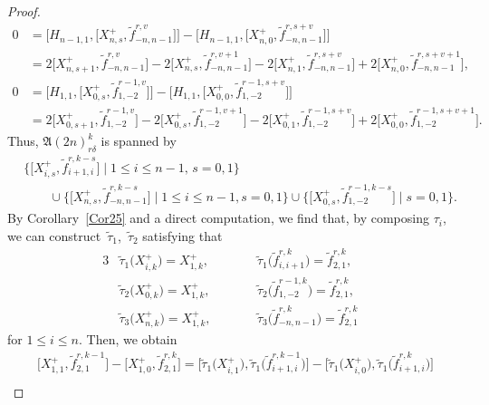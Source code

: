 \documentclass[10pt,a4paper]{amsart}
\numberwithin{equation}{section}
\theoremstyle{definition}
\begin{document}
\begin{proof}
\begin{align}
0&=\bigl[H_{n-1,1},\bigl[X^+_{n,s},\widetilde{f}_{-n,n-1}^{r,v}\bigr]\bigr]-\bigl[H_{n-1,1}, \bigl[X^+_{n,0},\widetilde{f}_{-n,n-1}^{r,s+v}\bigr]\bigr]\nonumber\\%
&=2\bigl[X^+_{n,s+1},\widetilde{f}_{-n,n-1}^{r,v}\bigr]-2\bigl[X^+_{n,s},\widetilde{f}_{-n,n-1}^{r,v+1}\bigr] -2\bigl[X^+_{n,1},\widetilde{f}_{-n,n-1}^{r,s+v}\bigr]+2\bigl[X^+_{n,0},\widetilde{f}_{-n,n-1}^{r,s+v+1}\bigr],\nonumber\\
0&=\bigl[H_{1,1},\bigl[X^+_{0,s},\widetilde{f}_{1,-2}^{r-1,v}\bigr]\bigr]-\bigl[H_{1,1},\bigl[X^+_{0,0},\widetilde{f}_{1,-2}^{r-1,s+v}\bigr]\bigr]\nonumber\\%
&=2\bigl[X^+_{0,s+1},\widetilde{f}_{1,-2}^{r-1,v}\bigr]-2\bigl[X^+_{0,s},\widetilde{f}_{1,-2}^{r-1,v+1}\bigr] -2\bigl[X^+_{0,1},\widetilde{f}_{1,-2}^{r-1,s+v}\bigr]+2\bigl[X^+_{0,0},\widetilde{f}_{1,-2}^{r-1,s+v+1}\bigr].\nonumber
\end{align}
Thus, $\mathfrak{A}(2n)_{r\delta}^k$ is spanned by
\begin{align*}
&\{\bigl[X^+_{i,s},\widetilde{f}_{i+1,i}^{r,k-s}\bigr]\mid1\leq i\leq n-1,\,s=0,1\}\\
& \qquad\cup\{\bigl[X^+_{n,s},\widetilde{f}_{-n,n-1}^{r,k-s}\bigr]\mid1\leq i\leq n-1,s=0,1\}\cup\{\bigl[X^+_{0,s},\widetilde{f}_{1,-2}^{r-1,k-s}\bigr]\mid s=0,1\}.
\end{align*}
By Corollary~\ref{Cor25} and a direct computation, we find that, by composing $\tau_i$, we can construct~$\widetilde{\tau}_1$,~$\widetilde{\tau}_2$ satisfying that
\begin{alignat*}{3}
& \widetilde{\tau}_1\bigl(X^+_{i,k}\bigr)=X^+_{1,k},\qquad && \widetilde{\tau}_1\bigl(\widetilde{f}_{i,i+1}^{r,k}\bigr)=\widetilde{f}_{2,1}^{r,k},&\\
&\widetilde{\tau}_2\bigl(X^+_{0,k}\bigr)=X^+_{1,k},\qquad && \widetilde{\tau}_2\bigl(\widetilde{f}_{1,-2}^{r-1,k}\bigr)=\widetilde{f}_{2,1}^{r,k},&\\
&\widetilde{\tau}_3\bigl(X^+_{n,k}\bigr)=X^+_{1,k},\qquad && \widetilde{\tau}_3\bigl(\widetilde{f}_{-n,n-1}^{r,k}\bigr)=\widetilde{f}_{2,1}^{r,k}&
\end{alignat*}
for $1\leq i\leq n$. Then, we obtain
\begin{gather}
\bigl[X^+_{1,1},\widetilde{f}_{2,1}^{r,k-1}\bigr]-\bigl[X^+_{1,0},\widetilde{f}_{2,1}^{r,k}\bigr]
=\bigl[\widetilde{\tau}_1\bigl(X^+_{i,1}\bigr),\widetilde{\tau}_1\bigl(\widetilde{f}_{i+1,i}^{r,k-1}\bigr)\bigr]-\bigl[\widetilde{\tau}_1\bigl(X^+_{i,0}\bigr),\widetilde{\tau}_1\bigl(\widetilde{f}_{i+1,i}^{r,k}\bigr)\bigr]\nonumber\\

\end{gather}
\end{proof}
\end{document}

